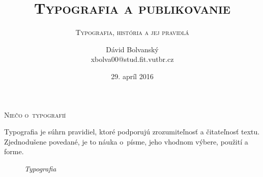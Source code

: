 \documentclass[xcolor=dvipsnames]{beamer}
\begin{document}
	
	\title{\textsc{\huge{Typografia a publikovanie}}}
	\subtitle{\textsc{\small{Typografia, história a jej pravidlá}}}
	\author{\scriptsize{Dávid Bolvanský\\xbolva00@stud.fit.vutbr.cz}}
	\date{\scriptsize{29. apríl 2016}}
	\maketitle

\begin{frame}{\textsc{\large{Niečo o~typografií}}}
	\begin{center}
		Typografia je súhrn pravidiel, ktoré podporujú zrozumiteľnosť a čitateľnosť textu. Zjednodušene povedané, je to náuka o~písme, jeho vhodnom výbere, použití a forme.
	\end{center}
	\begin{figure}[ht]
		\begin{center}
    		\caption{\textit{Typografia}}
		\end{center}
	\end{figure}
\end{frame}
\end{document}

